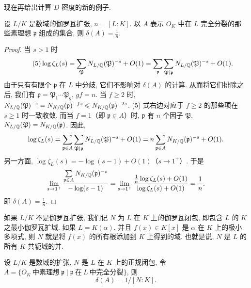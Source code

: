 现在再给出计算 $D$-密度的新的例子. 

\begin{theorem}\label{thm:5.2}
设 $L/K$ 是数域的伽罗瓦扩张, $n=[L:K]$. 以 $A$ 表示 $O_K$ 中在 $L$ 完全分裂的那些素理想 $\mathfrak{p}$ 组成的集合, 则 $\delta(A)=\frac{1}{n}$. 
\end{theorem}

\begin{proof}
当 $s>1$ 时
\begin{equation}\tag{5}
  \log\zeta_L(s)=\sum\limits_{\mathfrak{P}}N_{L/\mathbb{Q}}(\mathfrak{P})^{-s}+O(1)
  =\sum\limits_{\mathfrak{p}}\sum\limits_{\mathfrak{P}\mid\mathfrak{p}}N_{L/\mathbb{Q}}(\mathfrak{P})^{-s}+O(1).
\end{equation}
由于只有有限个 $\mathfrak{p}$ 在 $L$ 中分歧, 它们不影响对 $\delta(A)$ 的计算. 从而将它们排除之后, 我们有 $\mathfrak{p}=\mathfrak{P}_1\cdots\mathfrak{P}_g$, $gf=n$. 当 $f\geqslant 2$ 时, $N_{L/\mathbb{Q}}(\mathfrak{P})^{-s}=N_{K/\mathbb{Q}}(\mathfrak{p})^{-fs}\leqslant N_{K/\mathbb{Q}}(\mathfrak{p})^{-2s}$. (5) 式右边对应于 $f\geqslant 2$ 的那些项在 $s\geqslant 1$ 时一致收敛. 而当 $f=1$（即 $\mathfrak{p}\in A$）时, $\mathfrak{p}$ 有 $n$ 个因子 $\mathfrak{P}$, $N_{L/\mathbb{Q}}(\mathfrak{P})=N_{K/\mathbb{Q}}(\mathfrak{p})$. 因此, 
\[
  \log\zeta_L(s)=\sum\limits_{\mathfrak{p}\in A}\sum\limits_{\mathfrak{P}\mid\mathfrak{p}}N_{L/\mathbb{Q}}(\mathfrak{P})^{-s}+O(1)
  =n\sum\limits_{\mathfrak{p}\in A}N_{K/\mathbb{Q}}(\mathfrak{p})^{-s}+O(1).
\]
另一方面, $\log\zeta_L(s)=-\log(s-1)+O(1)$（$s\to1^+$）. 于是
\[
  \lim\limits_{s\to1^+}\frac{\sum\limits_{\mathfrak{p}\in A}N_{K/\mathbb{Q}}(\mathfrak{p})^{-s}}{-\log(s-1)}
  =\lim\limits_{s\to1^+}\frac{\frac{1}{n}\log\zeta_L(s)+O(1)}{\log\zeta_L(s)+O(1)}=\frac{1}{n}.
\]
即 $\delta(A)=\frac{1}{n}$. 
\end{proof}

如果 $L/K$ 不是伽罗瓦扩张, 我们记 $N$ 为 $L$ 在 $K$ 上的伽罗瓦闭包, 即包含 $L$ 的 $K$ 之最小伽罗瓦扩域. 如果 $L=K(\alpha)$, 并且 $f(x)\in K[x]$ 是 $\alpha$ 在 $K$ 上的极小多项式, 则 $N$ 就是将 $f(x)$ 的所有根添加到 $K$ 上得到的域. 也就是说, $N$ 是 $L$ 的所有 $K$-共轭域的并. 

\begin{sloppypar}
\begin{corollary}[1]
设 $L/K$ 是数域的扩张, $N$ 是 $L$ 在 $K$ 上的正规闭包, 令 $A=\{O_K\ \text{中素理想}\ \mathfrak{p}\mid\mathfrak{p}\ \text{在}\ L\ \text{中完全分裂}\}$, 则
\[
  \delta(A)=1/[N:K].
\]
\end{corollary}
\end{sloppypar}


